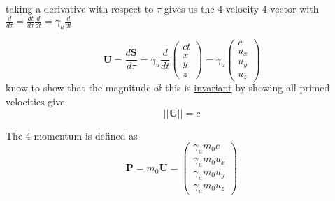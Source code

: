 taking a derivative with respect to $\tau$ gives us the 4-velocity 4-vector with $\frac{d}{d\tau} = \frac{dt}{d\tau}\frac{d}{dt} = \gamma_u \frac{d}{dt} $

\begin{equation}
     \mathbf{U} = \frac{d\mathbf{S}}{d\tau} = \gamma_u \frac{d}{dt} \begin{pmatrix}
         ct\\x\\y\\z
     \end{pmatrix} = \gamma_u \begin{pmatrix}
         c \\ u_x \\ u_y \\ u_z
     \end{pmatrix}
\end{equation}
know to show that the magnitude of this is \hyperlink{def-lorentz-invariant}{invariant} by showing all primed velocities give
\begin{equation}
     ||\mathbf{U}|| = c
\end{equation}

The 4 momentum is defined as
\begin{equation}
    \mathbf{P} = m_0 \mathbf{U} =  \begin{pmatrix}
         \gamma_u m_0 c \\ \gamma_u m_0 u_x \\ \gamma_u m_0 u_y \\ \gamma_u m_0 u_z
     \end{pmatrix}
\end{equation}



